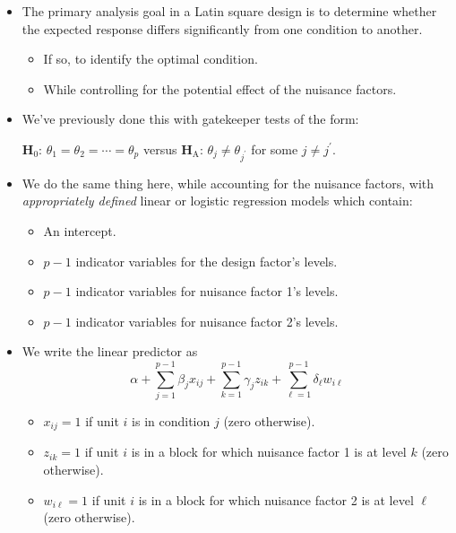 \begin{itemize}
\begin{itemize}
\begin{itemize}
\begin{itemize}
                              \end{itemize}
                    \end{itemize}
          \end{itemize}
    \item The primary analysis goal in a Latin square design is to determine whether the expected response differs significantly
          from one condition to another.
          \begin{itemize}
              \item If so, to identify the optimal condition.
              \item While controlling for the potential effect of the nuisance factors.
          \end{itemize}
    \item We've previously done this with gatekeeper tests of the form:
          \begin{tightcenter}
              $ \mathbf{H}_0 $: $ \theta_1=\theta_2=\cdots=\theta_p $ versus $ \mathbf{H}_\text{A} $: $ \theta_j\ne \theta_{j^\prime} $ for some $ j\ne j^\prime $.
          \end{tightcenter}
    \item We do the same thing here, while accounting for the nuisance factors, with \emph{appropriately defined} linear
          or logistic regression models which contain:
          \begin{itemize}
              \item An intercept.
              \item $ p-1 $ indicator variables for the design factor's levels.
              \item $ p-1 $ indicator variables for nuisance factor 1's levels.
              \item $ p-1 $ indicator variables for nuisance factor 2's levels.
          \end{itemize}
    \item We write the linear predictor as
          \[ \alpha+\sum_{j=1}^{p-1} \beta_j x_{ij}+\sum_{k=1}^{p-1} \gamma_j z_{ik}+\sum_{\ell=1}^{p-1} \delta_\ell w_{i\ell} \]
          \begin{itemize}
              \item $ x_{ij}=1 $ if unit $ i $ is in condition $ j $ (zero otherwise).
              \item $ z_{ik}=1 $ if unit $ i $ is in a block for which nuisance factor 1 is at level $ k $ (zero otherwise).
              \item $ w_{i\ell}=1 $ if unit $ i $ is in a block for which nuisance factor 2 is at level $ \ell $ (zero otherwise).

\end{itemize}
\end{itemize}
